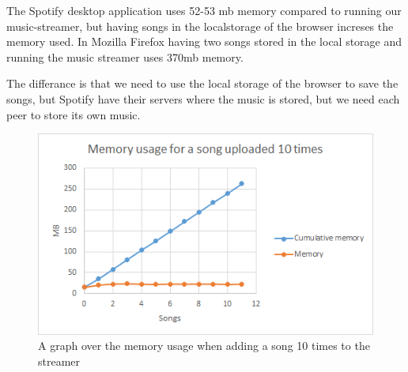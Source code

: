 The Spotify desktop application uses 52-53 mb memory compared to running our music-streamer, but having songs in the localstorage of the browser increses the memory used. In Mozilla Firefox having two songs stored in the local storage and running the music streamer uses 370mb memory.

The differance is that we need to use the local storage of the browser to save the songs, but Spotify have their servers where the music is stored, but we need each peer to store its own music.
\begin{figure}[H]
	\centering
	\includegraphics[scale=0.9]{gfx/memoryUsage}
	\caption{A graph over the memory usage when adding a song 10 times to the streamer}
	\label{fig:memoryUsage}
\end{figure}
